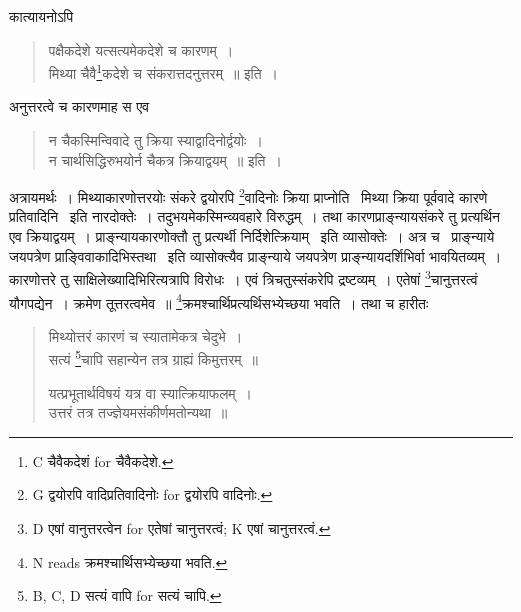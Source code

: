 \documentclass[11pt, openany]{book}
\begin{document}
कात्यायनोऽपि 

\begin{quote}
{\vy पक्षैकदेशे यत्सत्यमेकदेशे च कारणम्~।\\
मिथ्या चैवै\renewcommand{\thefootnote}{1}\footnote{C चैवैकदेशं for चैवैकदेशे.}कदेशे च संकरात्तदनुत्तरम्~॥} इति~।
\end{quote}

अनुत्तरत्वे च कारणमाह स एव 

\begin{quote}
{\vy न चैकस्मिन्विवादे तु क्रिया स्याद्वादिनोर्द्वयोः~।\\
न चार्थसिद्धिरुभयोर्न चैकत्र क्रियाद्वयम्~॥} इति~।
\end{quote}

अत्रायमर्थः~। मिथ्याकारणोत्तरयोः संकरे द्वयोरपि \renewcommand{\thefootnote}{2}\footnote{G द्वयोरपि वादिप्रतिवादिनोः for द्वयोरपि वादिनोः.}वादिनोः क्रिया प्राप्नोति \textendash\ मिथ्या क्रिया पूर्ववादे कारणे प्रतिवादिनि \textendash\ इति नारदोक्तेः~। तदुभयमेकस्मिन्व्यवहारे विरुद्धम्~। तथा कारणप्राङ्न्यायसंकरे तु प्रत्यर्थिन एव क्रियाद्वयम्~। प्राङ्न्यायकारणोक्तौ तु प्रत्यर्थी निर्दिशेत्क्रियाम् \textendash\ इति व्यासोक्तेः~। अत्र च \textendash\ प्राङ्न्याये जयपत्रेण प्राङ्विवाकादिभिस्तथा \textendash\ इति व्यासोक्त्यैव प्राङ्न्याये जयपत्रेण प्राङ्न्यायदर्शिभिर्वा भावयितव्यम्~। कारणोत्तरे तु साक्षिलेख्यादिभिरित्यत्रापि विरोधः~। एवं त्रिचतुस्संकरेपि द्रष्टव्यम्~। एतेषां \renewcommand{\thefootnote}{3}\footnote{D एषां वानुत्तरत्वेन for एतेषां चानुत्तरत्वं; K एषां चानुत्तरत्वं.}चानुत्तरत्वं यौगपद्येन~। क्रमेण तूत्तरत्वमेव~॥ \renewcommand{\thefootnote}{4}\footnote{N reads क्रमश्चार्थिसभ्येच्छया भवति.}क्रमश्चार्थिप्रत्यर्थिसभ्येच्छया भवति~। तथा च हारीतः

\begin{quote}
{\vy मिथ्योत्तरं कारणं च स्यातामेकत्र चेदुभे~।\\
सत्यं \renewcommand{\thefootnote}{5}\footnote{B, C, D सत्यं वापि for सत्यं चापि.}चापि सहान्येन तत्र ग्राह्यं किमुत्तरम्~॥

यत्प्रभूतार्थविषयं यत्र वा स्यात्क्रियाफलम्~।\\
उत्तरं तत्र तज्ज्ञेयमसंकीर्णमतोन्यथा~॥}
\end{quote}

\newpage
{}
\end{document}
